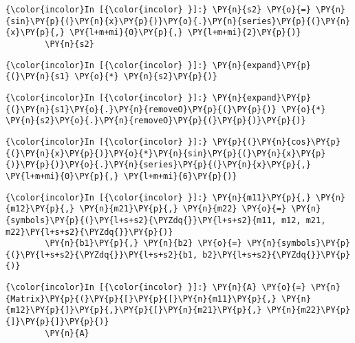     \begin{Verbatim}[commandchars=\\\{\}]
{\color{incolor}In [{\color{incolor} }]:} \PY{n}{s2} \PY{o}{=} \PY{n}{sin}\PY{p}{(}\PY{n}{x}\PY{p}{)}\PY{o}{.}\PY{n}{series}\PY{p}{(}\PY{n}{x}\PY{p}{,} \PY{l+m+mi}{0}\PY{p}{,} \PY{l+m+mi}{2}\PY{p}{)}
        \PY{n}{s2}
\end{Verbatim}

    \begin{Verbatim}[commandchars=\\\{\}]
{\color{incolor}In [{\color{incolor} }]:} \PY{n}{expand}\PY{p}{(}\PY{n}{s1} \PY{o}{*} \PY{n}{s2}\PY{p}{)}
\end{Verbatim}



    \begin{Verbatim}[commandchars=\\\{\}]
{\color{incolor}In [{\color{incolor} }]:} \PY{n}{expand}\PY{p}{(}\PY{n}{s1}\PY{o}{.}\PY{n}{removeO}\PY{p}{(}\PY{p}{)} \PY{o}{*} \PY{n}{s2}\PY{o}{.}\PY{n}{removeO}\PY{p}{(}\PY{p}{)}\PY{p}{)}
\end{Verbatim}



    \begin{Verbatim}[commandchars=\\\{\}]
{\color{incolor}In [{\color{incolor} }]:} \PY{p}{(}\PY{n}{cos}\PY{p}{(}\PY{n}{x}\PY{p}{)}\PY{o}{*}\PY{n}{sin}\PY{p}{(}\PY{n}{x}\PY{p}{)}\PY{p}{)}\PY{o}{.}\PY{n}{series}\PY{p}{(}\PY{n}{x}\PY{p}{,} \PY{l+m+mi}{0}\PY{p}{,} \PY{l+m+mi}{6}\PY{p}{)}
\end{Verbatim}







    \begin{Verbatim}[commandchars=\\\{\}]
{\color{incolor}In [{\color{incolor} }]:} \PY{n}{m11}\PY{p}{,} \PY{n}{m12}\PY{p}{,} \PY{n}{m21}\PY{p}{,} \PY{n}{m22} \PY{o}{=} \PY{n}{symbols}\PY{p}{(}\PY{l+s+s2}{\PYZdq{}}\PY{l+s+s2}{m11, m12, m21, m22}\PY{l+s+s2}{\PYZdq{}}\PY{p}{)}
        \PY{n}{b1}\PY{p}{,} \PY{n}{b2} \PY{o}{=} \PY{n}{symbols}\PY{p}{(}\PY{l+s+s2}{\PYZdq{}}\PY{l+s+s2}{b1, b2}\PY{l+s+s2}{\PYZdq{}}\PY{p}{)}
\end{Verbatim}

    \begin{Verbatim}[commandchars=\\\{\}]
{\color{incolor}In [{\color{incolor} }]:} \PY{n}{A} \PY{o}{=} \PY{n}{Matrix}\PY{p}{(}\PY{p}{[}\PY{p}{[}\PY{n}{m11}\PY{p}{,} \PY{n}{m12}\PY{p}{]}\PY{p}{,}\PY{p}{[}\PY{n}{m21}\PY{p}{,} \PY{n}{m22}\PY{p}{]}\PY{p}{]}\PY{p}{)}
        \PY{n}{A}
\end{Verbatim}

